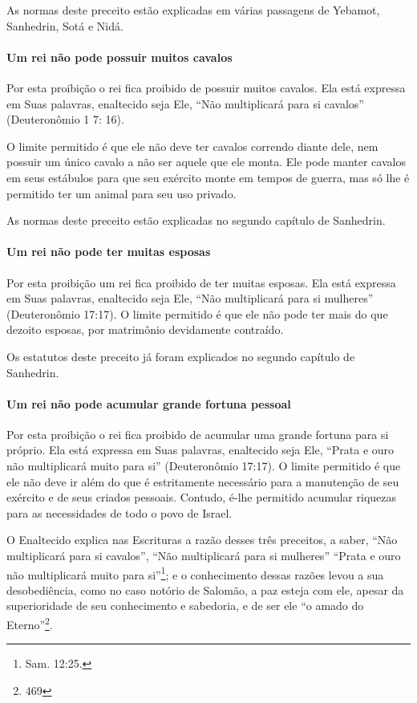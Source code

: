 As normas deste preceito estão explicadas em várias passagens de
Yebamot, Sanhedrin, Sotá e Nidá.

\paragraph{Um rei não pode possuir muitos cavalos}

Por esta proibição o rei fica proibido de possuir muitos cavalos. Ela
está expressa em Suas palavras, enaltecido seja Ele, ``Não multiplicará
para si cavalos'' (Deuteronômio 1 7: 16).

O limite permitido é que ele não deve ter cavalos correndo diante dele,
nem possuir um único cavalo a não ser aquele que ele monta. Ele pode
manter cavalos em seus estábulos para que seu exército monte em tempos
de guerra, mas só lhe é permitido ter um animal para seu uso privado.

As normas deste preceito estão explicadas no segundo capítulo de Sanhedrin.

\paragraph{Um rei não pode ter muitas esposas}

Por esta proibição um rei fica proibido de ter muitas esposas. Ela está
expressa em Suas palavras, enaltecido seja Ele, ``Não multiplicará para
si mulheres'' (Deuteronômio 17:17). O limite permitido é que ele não
pode ter mais do que dezoito esposas, por matrimônio devidamente
contraído.

Os estatutos deste preceito já foram explicados no segundo capítulo de
Sanhedrin.

\paragraph{Um rei não pode acumular grande fortuna pessoal}

Por esta proibição o rei fica proibido de acumular uma grande fortuna
para si próprio. Ela está expressa em Suas palavras, enaltecido seja
Ele, ``Prata e ouro não multiplicará muito para si'' (Deuteronômio
17:17). O limite permitido é que ele não deve ir além do que é
estritamente necessário para a manutenção de seu exército e de seus
criados pessoais. Contudo, é-lhe permitido acumular riquezas para as
necessidades de todo o povo de Israel.

O Enaltecido explica nas Escrituras a razão desses três preceitos, a
saber, ``Não multiplicará para si cavalos'', ``Não multiplicará para si
mulheres'' ``Prata e ouro não multiplicará muito para
si''\footnote{Sam. 12:25.}; e o conhecimento dessas razões levou a sua
desobediência, como no caso notório de Salomão, a paz esteja com ele,
apesar da superioridade de seu conhecimento e sabedoria, e de ser ele
``o amado do Eterno''\footnote{469}.

